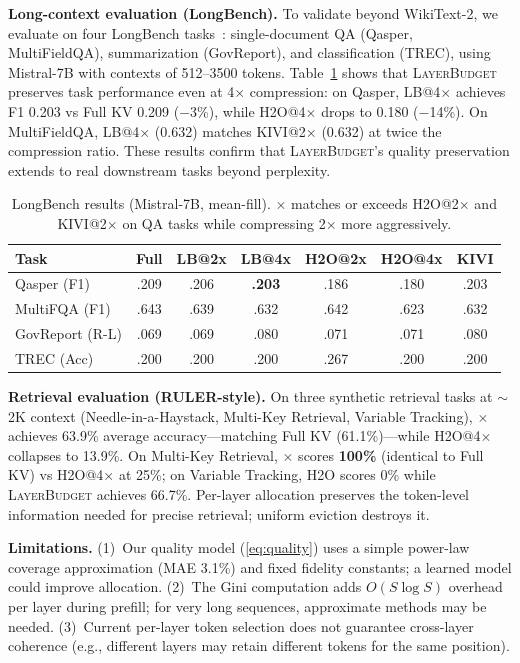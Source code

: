 \documentclass{article}
\newcommand{\layerbudget}{\textsc{LayerBudget}\xspace}
\begin{document}
\textbf{Long-context evaluation (LongBench).}
To validate beyond WikiText-2, we evaluate on four LongBench tasks~\citep{bai2024longbench}: single-document QA (Qasper, MultiFieldQA), summarization (GovReport), and classification (TREC), using Mistral-7B with contexts of 512--3500 tokens.
Table~\ref{tab:longbench} shows that \layerbudget preserves task performance even at 4$\times$ compression: on Qasper, LB@4$\times$ achieves F1 0.203 vs Full KV 0.209 ($-$3\%), while H2O@4$\times$ drops to 0.180 ($-$14\%).
On MultiFieldQA, LB@4$\times$ (0.632) matches KIVI@2$\times$ (0.632) at twice the compression ratio.
These results confirm that \layerbudget's quality preservation extends to real downstream tasks beyond perplexity.

\begin{table}[t]
\centering
\caption{LongBench results (Mistral-7B, mean-fill). $\times$ matches or exceeds H2O@2$\times$ and KIVI@2$\times$ on QA tasks while compressing 2$\times$ more aggressively.}
\label{tab:longbench}
\small
\setlength{\tabcolsep}{2.5pt}
\begin{tabular}{@{}lcccccc@{}}
\toprule
Task & Full & LB@2x & LB@4x & H2O@2x & H2O@4x & KIVI \\
\midrule
Qasper (F1)      & .209 & .206 & \textbf{.203} & .186 & .180 & .203 \\
MultiFQA (F1)    & .643 & .639 & .632 & .642 & .623 & .632 \\
GovReport (R-L)  & .069 & .069 & .080 & .071 & .071 & .080 \\
TREC (Acc)       & .200 & .200 & .200 & .267 & .200 & .200 \\
\bottomrule
\end{tabular}
\vspace{-0.1in}
\end{table}

\textbf{Retrieval evaluation (RULER-style).}
On three synthetic retrieval tasks at $\sim$2K context (Needle-in-a-Haystack, Multi-Key Retrieval, Variable Tracking), $\times$ achieves 63.9\% average accuracy---matching Full KV (61.1\%)---while H2O@4$\times$ collapses to 13.9\%.
On Multi-Key Retrieval, $\times$ scores \textbf{100\%} (identical to Full KV) vs H2O@4$\times$ at 25\%; on Variable Tracking, H2O scores 0\% while \layerbudget achieves 66.7\%.
Per-layer allocation preserves the token-level information needed for precise retrieval; uniform eviction destroys it.

\textbf{Limitations.}
(1)~Our quality model (\cref{eq:quality}) uses a simple power-law coverage approximation (MAE 3.1\%) and fixed fidelity constants; a learned model could improve allocation.
(2)~The Gini computation adds $O(S \log S)$ overhead per layer during prefill; for very long sequences, approximate methods may be needed.
(3)~Current per-layer token selection does not guarantee cross-layer coherence (e.g., different layers may retain different tokens for the same position).
\end{document}
